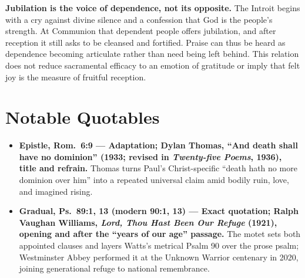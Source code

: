 \begin{deepstudy}
\noindent\textbf{Jubilation is the voice of dependence, not its opposite.\enspace{}}
The Introit begins with a cry against divine silence and a confession that God is the people's strength. At Communion that dependent people offers jubilation, and after reception it still asks to be cleansed and fortified. Praise can thus be heard as dependence becoming articulate rather than need being left behind. This relation does not reduce sacramental efficacy to an emotion of gratitude or imply that felt joy is the measure of fruitful reception.

\newpage
\sectionguard
\section*{Notable Quotables}
{\small
\begin{itemize}[itemsep=0em,topsep=0.15em,parsep=0pt]
\item \textbf{Epistle, Rom.~6:9 --- Adaptation; Dylan Thomas, ``And death shall have no dominion'' (1933; revised in \emph{Twenty-five Poems}, 1936), title and refrain.} Thomas turns Paul's Christ-specific ``death hath no more dominion over him'' into a repeated universal claim amid bodily ruin, love, and imagined rising.
\item \textbf{Gradual, Ps.~89:1, 13 (modern 90:1, 13) --- Exact quotation; Ralph Vaughan Williams, \emph{Lord, Thou Hast Been Our Refuge} (1921), opening and after the ``years of our age'' passage.} The motet sets both appointed clauses and layers Watts's metrical Psalm 90 over the prose psalm; Westminster Abbey performed it at the Unknown Warrior centenary in 2020, joining generational refuge to national remembrance.
\end{itemize}
}

\sectionguard

\end{deepstudy}
